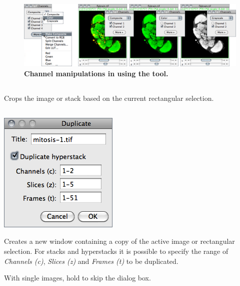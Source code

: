 \begin{figure}[h]
\includegraphics[width=1\columnwidth]{images/ChannelsTool}\caption[\protect{}\ widget]{\textbf{\label{fig:Channels-tool}Channel manipulations in 
 using the \protect{}
tool.}}
\end{figure}



\subsection[{\protect\userinterface{Crop {[}X{]}}}]{\protect{}\label{sub:Crop-[X]}\improvement{}}

Crops the image or stack based on the current rectangular
selection.


\subsection[{\protect\userinterface{Duplicate\ldots{}\ {[}D{]}}}]{\protect{}\label{sub:Duplicate...[D]}\improvement{}}

\begin{minipage}[c][1\totalheight][t]{0.32\columnwidth}%
\includegraphics[scale=0.55]{images/Duplicate}%
\end{minipage}%
\begin{minipage}[c][1\totalheight][t]{0.68\columnwidth}%
Creates a new window containing a copy of the active image or rectangular
selection. For stacks and hyperstacks it is possible to specify the
range of \emph{Channels (c)}, \emph{Slices (z)} and \emph{Frames (t)}
to be duplicated.\medskip{}


With single images, hold  to skip the dialog box.


%
\end{minipage}



